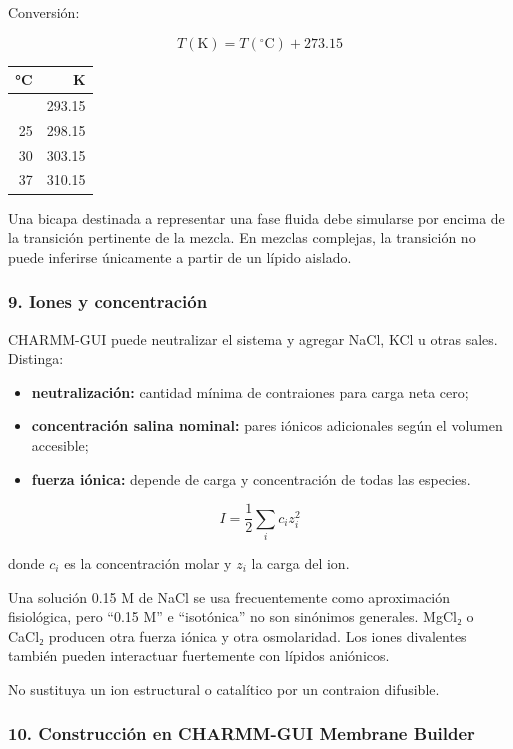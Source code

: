 \documentclass[
  spanish,
  11pt,
  a4paper]{article}
\newcounter{none} %
\providecommand{\tightlist}{%
  \setlength{\itemsep}{0pt}\setlength{\parskip}{0pt}}
\begin{document}
Conversión:

\[
T(\mathrm{K})=T(^{\circ}\mathrm{C})+273.15
\]

{\def\LTcaptype{none} %
\begin{longtable}[]{@{}rr@{}}
\toprule\noalign{}
°C & K \\
\midrule\noalign{}
\endhead
\bottomrule\noalign{}
\endlastfoot
20 & 293.15 \\
25 & 298.15 \\
30 & 303.15 \\
37 & 310.15 \\
\end{longtable}
}

Una bicapa destinada a representar una fase fluida debe simularse por
encima de la transición pertinente de la mezcla. En mezclas complejas,
la transición no puede inferirse únicamente a partir de un lípido
aislado.

\subsubsection{9. Iones y concentración}\label{iones-y-concentraciuxf3n}

CHARMM-GUI puede neutralizar el sistema y agregar NaCl, KCl u otras
sales. Distinga:

\begin{itemize}
\tightlist
\item
  \textbf{neutralización:} cantidad mínima de contraiones para carga
  neta cero;
\item
  \textbf{concentración salina nominal:} pares iónicos adicionales según
  el volumen accesible;
\item
  \textbf{fuerza iónica:} depende de carga y concentración de todas las
  especies.
\end{itemize}

\[
I=\frac{1}{2}\sum_i c_i z_i^2
\]

donde \(c_i\) es la concentración molar y \(z_i\) la carga del ion.

Una solución 0.15 M de NaCl se usa frecuentemente como aproximación
fisiológica, pero ``0.15 M'' e ``isotónica'' no son sinónimos generales.
MgCl₂ o CaCl₂ producen otra fuerza iónica y otra osmolaridad. Los iones
divalentes también pueden interactuar fuertemente con lípidos aniónicos.

No sustituya un ion estructural o catalítico por un contraion difusible.

\subsubsection{10. Construcción en CHARMM-GUI Membrane
Builder}\label{construcciuxf3n-en-charmm-gui-membrane-builder}
\end{document}
